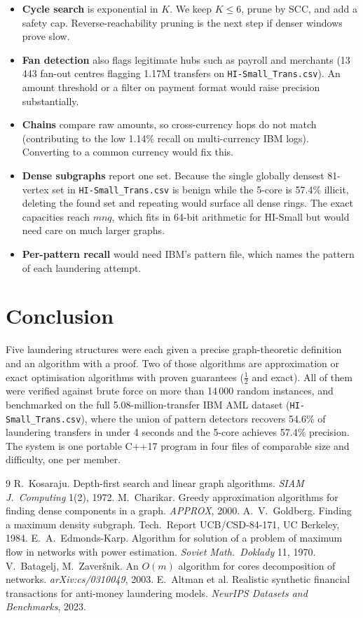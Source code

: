 \documentclass[11pt,a4paper]{article}
\theoremstyle{definition}
\begin{document}
\begin{itemize}[leftmargin=1.5em]
\item \textbf{Cycle search} is exponential in $K$. We keep $K \le 6$, prune by SCC, and add a safety cap. Reverse-reachability pruning is the next step if denser windows prove slow.
\item \textbf{Fan detection} also flags legitimate hubs such as payroll and merchants (13\,443 fan-out centres flagging 1.17M transfers on \texttt{HI-Small\_Trans.csv}). An amount threshold or a filter on payment format would raise precision substantially.
\item \textbf{Chains} compare raw amounts, so cross-currency hops do not match (contributing to the low 1.14\% recall on multi-currency IBM logs). Converting to a common currency would fix this.
\item \textbf{Dense subgraphs} report one set. Because the single globally densest 81-vertex set in \texttt{HI-Small\_Trans.csv} is benign while the 5-core is 57.4\% illicit, deleting the found set and repeating would surface all dense rings. The exact capacities reach $mnq$, which fits in 64-bit arithmetic for HI-Small but would need care on much larger graphs.
\item \textbf{Per-pattern recall} would need IBM's pattern file, which names the pattern of each laundering attempt.
\end{itemize}

\section{Conclusion}

Five laundering structures were each given a precise graph-theoretic definition and an algorithm with a proof. Two of those algorithms are approximation or exact optimisation algorithms with proven guarantees ($\frac{1}{2}$ and exact). All of them were verified against brute force on more than 14\,000 random instances, and benchmarked on the full 5.08-million-transfer IBM AML dataset (\texttt{HI-Small\_Trans.csv}), where the union of pattern detectors recovers 54.6\% of laundering transfers in under 4 seconds and the 5-core achieves 57.4\% precision. The system is one portable C++17 program in four files of comparable size and difficulty, one per member.

\begin{thebibliography}{9}
 R.~Kosaraju. Depth-first search and linear graph algorithms. \emph{SIAM J.\ Computing} 1(2), 1972.
 M.~Charikar. Greedy approximation algorithms for finding dense components in a graph. \emph{APPROX}, 2000.
 A.~V.~Goldberg. Finding a maximum density subgraph. Tech.\ Report UCB/CSD-84-171, UC Berkeley, 1984.
 E.~A.~Edmonds-Karp. Algorithm for solution of a problem of maximum flow in networks with power estimation. \emph{Soviet Math.\ Doklady} 11, 1970.
 V.~Batagelj, M.~Zaver\v{s}nik. An $O(m)$ algorithm for cores decomposition of networks. \emph{arXiv:cs/0310049}, 2003.
 E.~Altman et al. Realistic synthetic financial transactions for anti-money laundering models. \emph{NeurIPS Datasets and Benchmarks}, 2023.
\end{thebibliography}
\end{document}
